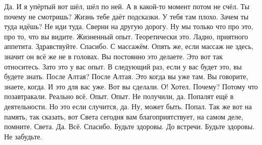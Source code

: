 \I
Да. И я упёртый вот шёл, шёл по ней.
А в какой-то момент потом не счёл.
Ты почему не смотришь?
Жизнь тебе даёт подсказки.
У тебя там плохо.
Зачем ты туда идёшь?
Не иди туда.
Сверни на другую дорогу.
Ну мы только что про это, про то, что вы видите.
Жизненный опыт.
Теоретически это.
Ладно, приятного аппетита.
Здравствуйте.
Спасибо.
С массажём.
Опять же, если массаж не здесь, значит он всё же не в головах.
Вы постоянно это делаете.
Это вот так относитесь.
Зато это у вас опыт.
В следующий раз, если у вас будет это, вы будете знать.
После Алтая?
После Алтая.
Это когда вы уже там.
Вы говорите, знаете, когда.
И это для вас уже.
Вот вы сделали.
О!
Хотел.
Почему?
Потому что позавтракали.
Реально всё.
Опыт.
Опыт.
Не получили, да.
Попалят ещё в деятельности.
Но это если случится, да.
Ну, может быть.
Попал.
Так же вот на память, так сказать, вот Света сегодня
вам благоприятствует, на самом деле, помните.
Света.
Да.
Всё.
Спасибо.
Будьте здоровы.
До встречи.
Будьте здоровы.
Не забудьте.
\bye
